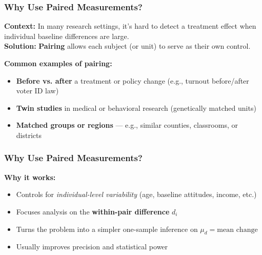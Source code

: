 \documentclass[handout]{beamer}
\begin{document}


\begin{frame}
\frametitle{Why Use Paired Measurements?}
\small
\vspace{-0.3em}
\textbf{Context:} In many research settings, it's hard to detect a treatment effect when individual baseline differences are large.  
\\[0.6em]
\textbf{Solution:} \textbf{Pairing} allows each subject (or unit) to serve as their own control.

\vspace{1em}
\textbf{Common examples of pairing:}
\begin{itemize}
  \item \textbf{Before vs. after} a treatment or policy change (e.g., turnout before/after voter ID law)
  \item \textbf{Twin studies} in medical or behavioral research (genetically matched units)
  \item \textbf{Matched groups or regions} — e.g., similar counties, classrooms, or districts
\end{itemize}
\end{frame}

\begin{frame}
\frametitle{Why Use Paired Measurements?}
\textbf{Why it works:}
\begin{itemize}
  \item Controls for \textit{individual-level variability} (age, baseline attitudes, income, etc.)
  \item Focuses analysis on the \textbf{within-pair difference} \(d_i\)
  \item Turns the problem into a simpler one-sample inference on \(\mu_d = \text{mean change}\)
  \item Usually improves precision and statistical power
\end{itemize}
\end{frame}
\end{document}
